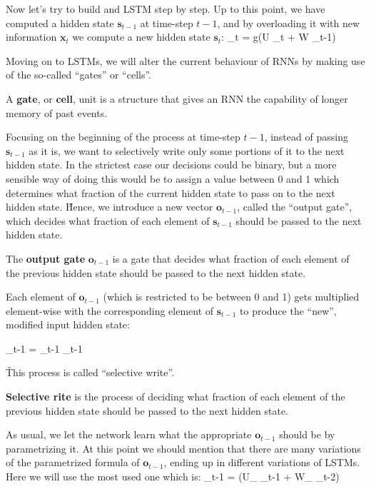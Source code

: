 Now let's try to build and LSTM step by step. Up to this point, we have computed a hidden state $\boldsymbol{s}_{t-1}$
at time-step $t - 1$, and by overloading it with new information $\boldsymbol{x}_{t}$ we compute a new hidden state
$\boldsymbol{s}_{t}$:
\bse
{}_{t} = g(U _{t} + W _{t-1})
\ese


Moving on to LSTMs, we will alter the current behaviour of RNNs by making use of the so-called ``gates'' or ``cells''.

A \textbf{gate}, or \textbf{cell}, unit is a structure that gives an RNN the capability of longer memory of past events.
\ed

Focusing on the beginning of the process at time-step $t-1$, instead of passing $\boldsymbol{s}_{t-1}$ as it is, we
want to selectively write only some portions of it to the next hidden state. In the strictest case our decisions could
be binary, but a more sensible way of doing this would be to assign a value between 0 and 1 which determines what
fraction of the current hidden state to pass on to the next hidden state. \v

Hence, we introduce a new vector $\boldsymbol{o}_{t-1}$, called the ``output gate'', which decides what fraction of each
element of $\boldsymbol{s}_{t-1}$ should be passed to the next hidden state.

The \textbf{output gate} $\boldsymbol{o}_{t-1}$ is a gate that decides what fraction of each element of the previous
hidden state should be passed to the next hidden state.
\ed

Each element of $\boldsymbol{o}_{t-1}$ (which is restricted to be between 0 and 1) gets multiplied element-wise with
the corresponding element of $\boldsymbol{s}_{t-1}$ to produce the ``new'', modified input hidden state:

\bse
{}_{t-1} = _{t-1} \odot {}_{t-1}
\ese

\v

This process is called ``selective write''.

\textbf{Selective rite} is the process of deciding what fraction of each element of the previous hidden state should be passed
to the next hidden state.
\ed


As usual, we let the network learn what the appropriate $\boldsymbol{o}_{t-1}$ should be by parametrizing it. At this
point we should mention that there are many variations of the parametrized formula of $\boldsymbol{o}_{t-1}$, ending up
in different variations of LSTMs. Here we will use the most used one which is:
\bse
{}_{t-1} = \sigma(U_{} _{t-1} + W_{} _{t-2})
\ese

